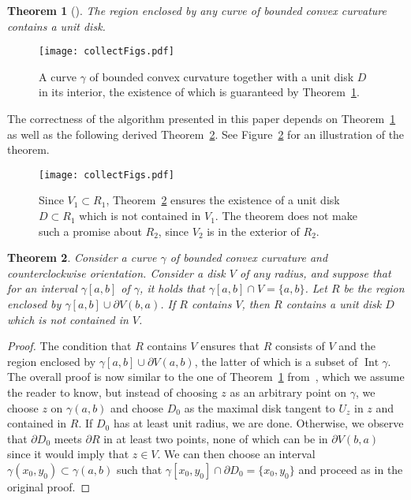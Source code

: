 \documentclass{article}
\DeclareMathOperator{\Int}{Int}
\newtheorem{theorem}{Theorem}[section]
\begin{document}
\begin{theorem}[\cite{aam2019disks}]\label{MAINTHM}
The region enclosed by any curve of bounded convex curvature contains a unit disk.
\end{theorem}

\begin{figure}
\centering
\texttt{[image: collectFigs.pdf]}
\caption{A curve $\gamma$ of bounded convex curvature together with a unit disk $D$ in its interior, the existence of which is guaranteed by Theorem~\ref{MAINTHM}.}
\label{mainThmFig}
\end{figure}

The correctness of the algorithm presented in this paper depends on Theorem~\ref{MAINTHM} as well as the following derived Theorem~\ref{mainThm}.
See Figure~\ref{mainThmFig} for an illustration of the theorem.

\begin{figure}
\centering
\texttt{[image: collectFigs.pdf]}
\caption{Since $V_1\subset R_1$, Theorem~\ref{mainThm} ensures the existence of a unit disk $D\subset R_1$ which is not contained in $V_1$.
The theorem does not make such a promise about $R_2$, since $V_2$ is in the exterior of $R_2$.}
\label{mainThmFig}
\end{figure}

\begin{theorem}\label{mainThm}
Consider a curve $\gamma$ of bounded convex curvature and counterclockwise orientation.
Consider a disk $V$ of any radius, and suppose that for an interval $\gamma[a,b]$ of $\gamma$, it holds that $\gamma[a,b]\cap V=\{a,b\}$.
Let $R$ be the region enclosed by $\gamma[a,b]\cup\partial V(b,a)$.
If $R$ contains $V$, then $R$ contains a unit disk $D$ which is not contained in $V$. 
\end{theorem}

\begin{proof}
The condition that $R$ contains $V$ ensures that $R$ consists of $V$ and the region enclosed by $\gamma[a,b]\cup\partial V(a,b)$, the latter of which is a subset of $\Int\gamma$.
The overall proof is now similar to the one of Theorem~\ref{MAINTHM} from~\cite{aam2019disks}, which we assume the reader to know, but instead of choosing $z$ as an arbitrary point on $\gamma$, we choose $z$ on $\gamma(a,b)$ and choose $D_0$ as the maximal disk tangent to $U_z$ in $z$ and contained in $R$.
If $D_0$ has at least unit radius, we are done.
Otherwise, we observe that $\partial D_0$ meets $\partial R$ in at least two points, none of which can be in $\partial V(b,a)$ since it would imply that $z\in V$.
We can then choose an interval $\gamma(x_0,y_0)\subset\gamma(a,b)$ such that $\gamma[x_0,y_0]\cap\partial D_0=\{x_0,y_0\}$ and proceed as in the original proof.
\end{proof}
\end{document}
